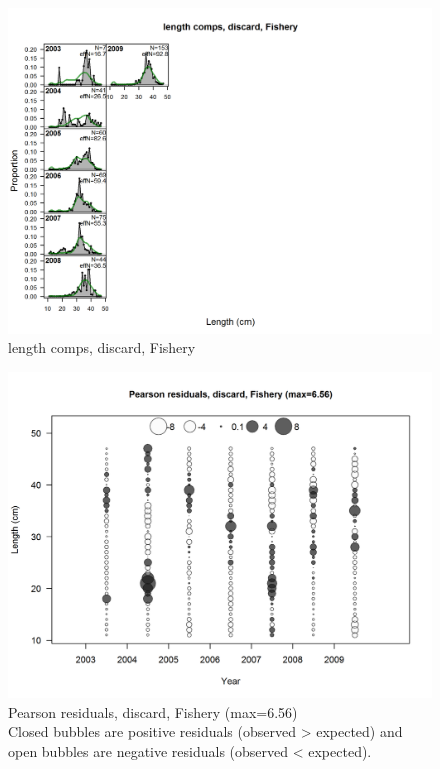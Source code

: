 \documentclass[12pt,]{article}
\begin{document}
\FloatBarrier

\FloatBarrier

\FloatBarrier

\FloatBarrier

\FloatBarrier

\FloatBarrier

\begin{figure}
\centering
\includegraphics{./r4ss/plots_mod1/comp_lenfit_flt1mkt1.png}
\caption{length comps, discard, Fishery
\label{fig:mod1_1_comp_lenfit_flt1mkt1}}
\end{figure}

\begin{figure}
\centering
\includegraphics{./r4ss/plots_mod1/comp_lenfit_residsflt1mkt1.png}
\caption{Pearson residuals, discard, Fishery (max=6.56)\\
Closed bubbles are positive residuals (observed \textgreater{} expected)
and open bubbles are negative residuals (observed \textless{} expected).
\label{fig:mod1_2_comp_lenfit_residsflt1mkt1}}
\end{figure}
\end{document}
